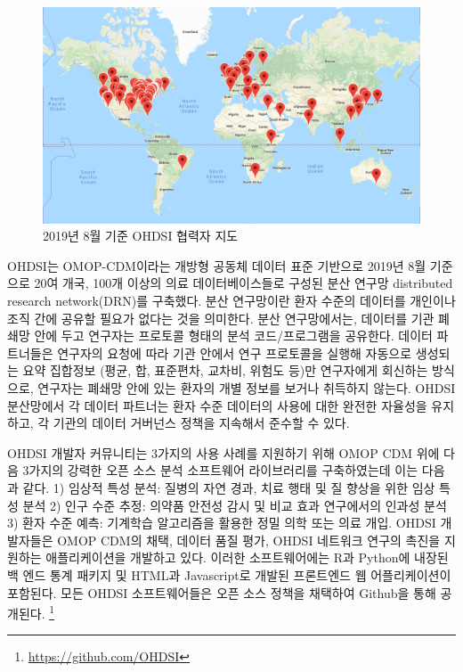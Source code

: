\documentclass[11pt]{book}
\let\rmarkdownfootnote\footnote%
\def\footnote{\protect\rmarkdownfootnote}
\theoremstyle{definition}
\theoremstyle{definition}
\theoremstyle{definition}
\theoremstyle{remark}
\begin{document}
\begin{figure}

{\centering \includegraphics[width=1\linewidth]{images/OhdsiCommunity/mapOfCollaborators} 

}

\caption{2019년 8월 기준 OHDSI 협력자 지도}\label{fig:collaboratormap}
\end{figure}

OHDSI는 OMOP-CDM이라는 개방형 공동체 데이터 표준 기반으로 2019년 8월
기준으로 20여 개국, 100개 이상의 의료 데이터베이스들로 구성된 분산
연구망 distributed research network(DRN)를 구축했다. 분산 연구망이란
환자 수준의 데이터를 개인이나 조직 간에 공유할 필요가 없다는 것을
의미한다. 분산 연구망에서는, 데이터를 기관 폐쇄망 안에 두고 연구자는
프로토콜 형태의 분석 코드/프로그램을 공유한다. 데이터 파트너들은
연구자의 요청에 따라 기관 안에서 연구 프로토콜을 실행해 자동으로
생성되는 요약 집합정보 (평균, 합, 표준편차, 교차비, 위험도 등)만
연구자에게 회신하는 방식으로, 연구자는 폐쇄망 안에 있는 환자의 개별
정보를 보거나 취득하지 않는다. OHDSI 분산망에서 각 데이터 파트너는 환자
수준 데이터의 사용에 대한 완전한 자율성을 유지하고, 각 기관의 데이터
거버넌스 정책을 지속해서 준수할 수 있다.

OHDSI 개발자 커뮤니티는 3가지의 사용 사례를 지원하기 위해 OMOP CDM 위에
다음 3가지의 강력한 오픈 소스 분석 소프트웨어 라이브러리를 구축하였는데
이는 다음과 같다. 1) 임상적 특성 분석: 질병의 자연 경과, 치료 행태 및 질
향상을 위한 임상 특성 분석 2) 인구 수준 추정: 의약품 안전성 감시 및 비교
효과 연구에서의 인과성 분석 3) 환자 수준 예측: 기계학습 알고리즘을
활용한 정밀 의학 또는 의료 개입. OHDSI 개발자들은 OMOP CDM의 채택,
데이터 품질 평가, OHDSI 네트워크 연구의 촉진을 지원하는 애플리케이션을
개발하고 있다. 이러한 소프트웨어에는 R과 Python에 내장된 백 엔드 통계
패키지 및 HTML과 Javascript로 개발된 프론트엔드 웹 어플리케이션이
포함된다. 모든 OHDSI 소프트웨어들은 오픈 소스 정책을 채택하여 Github을
통해 공개된다. \footnote{\url{https://github.com/OHDSI}}
\end{document}
